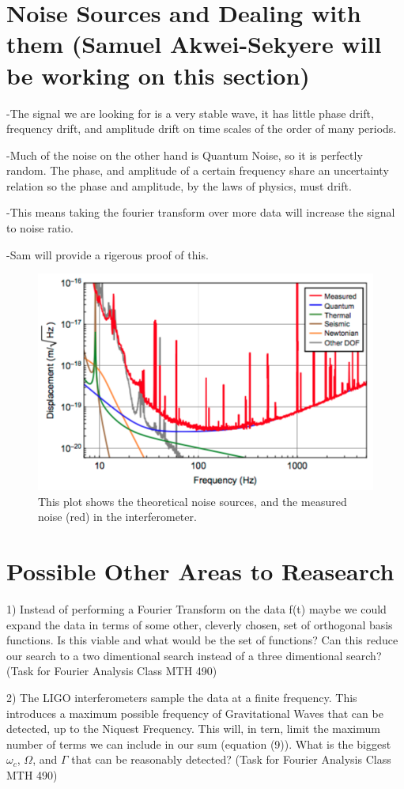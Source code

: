\documentclass[twocolumn, groupedaddress]{revtex4-1}
\begin{document}
\section{Noise Sources and Dealing with them (Samuel Akwei-Sekyere will be working on this section)}
-The signal we are looking for is a very stable wave, it has little phase drift, frequency drift, and amplitude drift on time scales of the order of many periods.

-Much of the noise on the other hand is Quantum Noise, so it is perfectly random.  The phase, and amplitude of a certain frequency share an uncertainty relation so the phase and amplitude, by the laws of physics, must drift.

-This means taking the fourier transform over more data will increase the signal to noise ratio.

-Sam will provide a rigerous proof of this.

\begin{figure}[H]
	\centering
	\includegraphics[width=.75\linewidth]{aligoNoise.png}
	\caption{This plot shows the theoretical noise sources, and the measured noise (red) in the interferometer.}
\end{figure}

\section{Possible Other Areas to Reasearch}
1) Instead of performing a Fourier Transform on the data f(t) maybe we could expand the data in terms of some other, cleverly chosen, set of orthogonal basis functions.  Is this viable and what would be the set of functions?  Can this reduce our search to a two dimentional search instead of a three dimentional search? (Task for Fourier Analysis Class MTH 490)

2) The LIGO interferometers sample the data at a finite frequency.  This introduces a maximum possible frequency of Gravitational Waves that can be detected, up to the Niquest Frequency.  This will, in tern, limit the maximum number of terms we can include in our sum (equation (9)).  What is the biggest $\omega_c$, $\Omega$, and $\Gamma$ that can be reasonably detected? (Task for Fourier Analysis Class MTH 490)
\end{document}
